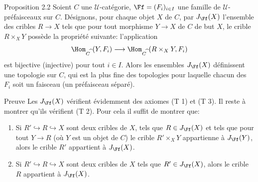 \begin{enonce*}{Proposition 2.2}
Soient $C$ une $𝒰$-catégorie, $\Ff=(F_i)_{i\in I}$ une
famille de $𝒰$-préfaisceaux sur $C$. Désignons, pour
chaque objet $X$ de $C$, par $J_{\Ff}(X)$ l'ensemble des cribles
$R\rightarrow X$ tels que pour tout morphisme $Y\rightarrow X$ de
$C$ de but $X$, le crible $R\times_X Y$ possède la propriété
suivante: l'application
$$
\Hom_{C^{\widehat{\phantom{,}}}}(Y,F_i)\longrightarrow
\Hom_{C^{\widehat{\phantom{,}}}} (R\times_X Y, F_i)
$$
est bijective (\resp injective) pour tout $i\in I$. Alors les
ensembles $J_{\Ff}(X)$ définissent une topologie sur $C$, qui est
la plus fine des topologies pour laquelle chacun des $F_i$ soit un
faisceau (\resp un préfaisceau séparé).
\end{enonce*}

\begin{enonce*}[remark]{Preuve}
Les $J_{\Ff}(X)$ vérifient évidemment des axiomes (T 1) et (T
3). Il reste à montrer qu'ils vérifient (T 2). Pour cela il suffit
de montrer que:
\begin{enumerate}
\renewcommand{\labelenumi}{\theenumi)}
\item Si $R'\hookrightarrow R\hookrightarrow X$ sont deux cribles de
  $X$, tels que $R\in J_{\Ff}(X)$ et tels que pour tout
  $Y\rightarrow R$ (où $Y$ est un objet de $C$) le crible
  $R'\times_X Y$ appartienne à $J_{\Ff}(Y)$, alors le crible
  $R'$ appartient à $J_{\Ff}(X)$.

\item Si $R'\hookrightarrow R\hookrightarrow X$ sont deux cribles de
  $X$ tels que $R'\in J_{\Ff}(X)$, alors le crible $R$
  appartient à $J_{\Ff}(X)$.
\end{enumerate}
\end{enonce*}

